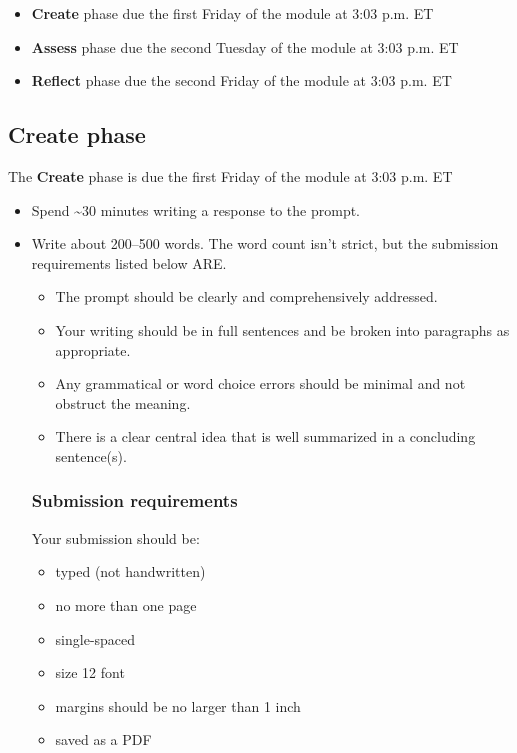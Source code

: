 \documentclass[
  openany]{book}
\begin{document}
\begin{itemize}
\item
  \textbf{Create} phase due the first Friday of the module at 3:03 p.m. ET
\item
  \textbf{Assess} phase due the second Tuesday of the module at 3:03 p.m. ET
\item
  \textbf{Reflect} phase due the second Friday of the module at 3:03 p.m. ET
\end{itemize}

\hypertarget{create-phase}{%
\subsection{Create phase}\label{create-phase}}

The \textbf{Create} phase is due the first Friday of the module at 3:03 p.m. ET

\begin{itemize}
\item
  Spend \textasciitilde30 minutes writing a response to the prompt.
\item
  Write about 200--500 words. The word count isn't strict, but the submission requirements listed below ARE.

  \begin{itemize}
  \item
    The prompt should be clearly and comprehensively addressed.
  \item
    Your writing should be in full sentences and be broken into paragraphs as appropriate.
  \item
    Any grammatical or word choice errors should be minimal and not obstruct the meaning.
  \item
    There is a clear central idea that is well summarized in a concluding sentence(s).
  \end{itemize}

  \hypertarget{submission-requirements}{%
  \subsubsection{Submission requirements}\label{submission-requirements}}

  Your submission should be:

  \begin{itemize}
  \item
    typed (not handwritten)
  \item
    no more than one page
  \item
    single-spaced
  \item
    size 12 font
  \item
    margins should be no larger than 1 inch
  \item
    saved as a PDF
  \end{itemize}
\end{itemize}
\end{document}
